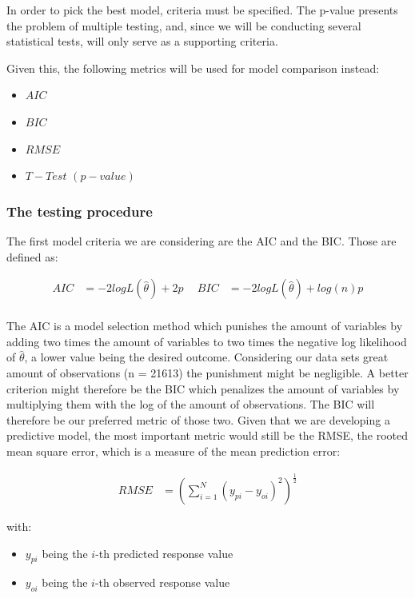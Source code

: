 \documentclass[table]{article}
\providecommand{\tightlist}{%
  \setlength{\itemsep}{0pt}\setlength{\parskip}{0pt}}
\begin{document}
In order to pick the best model, criteria must be specified. The p-value
presents the problem of multiple testing, and, since we will be
conducting several statistical tests, will only serve as a supporting
criteria.

Given this, the following metrics will be used for model comparison
instead:

\begin{itemize}
\tightlist
\item
  \(AIC\)
\item
  \(BIC\)
\item
  \(RMSE\)
\item
  \(T-Test\) \((p-value)\)
\end{itemize}

\subsubsection{The testing procedure}\label{the-testing-procedure}

The first model criteria we are considering are the AIC and the BIC.
Those are defined as:

\begin{align*}
    AIC &= -2logL(\hat{\theta}) + 2p \ & \ BIC &= -2logL(\hat{\theta}) + log(n)p\\
\end{align*}

The AIC is a model selection method which punishes the amount of
variables by adding two times the amount of variables to two times the
negative log likelihood of \(\hat{\theta}\), a lower value being the
desired outcome. Considering our data sets great amount of observations
(n = 21613) the punishment might be negligible. A better criterion might
therefore be the BIC which penalizes the amount of variables by
multiplying them with the log of the amount of observations. The BIC
will therefore be our preferred metric of those two. \newpage
Given that we are developing a predictive model, the most important
metric would still be the RMSE, the rooted mean square error, which is a
measure of the mean prediction error:

\begin{align*}
    RMSE &= \left(\sum_{i = 1}^{N} \left(y_{pi} - y_{oi}\right)^{2} \right)^{\frac{1}{2}}
\end{align*}

with:

\begin{itemize}
\tightlist
\item
  \(y_{pi}\) being the \(i\)-th predicted response value
\item
  \(y_{oi}\) being the \(i\)-th observed response value
\end{itemize}
\end{document}
